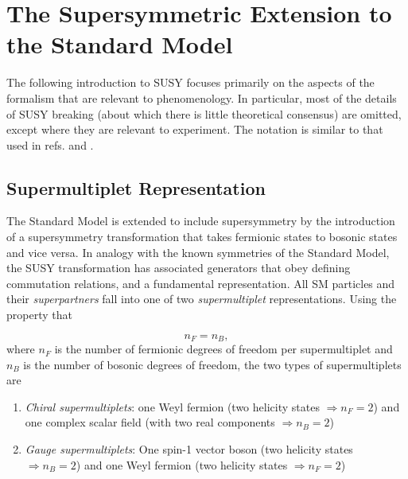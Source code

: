\documentclass[dissertation.tex]{subfiles}
\begin{document}
\chapter{The Supersymmetric Extension to the Standard Model}
\label{chap:The Supersymmetric Extension to the Standard Model}

The following introduction to SUSY focuses primarily on the aspects of the formalism that are relevant to phenomenology.  In particular, most of the details of SUSY breaking (about which there is little theoretical consensus) are omitted, except where they are relevant to experiment.  The notation is similar to that used in refs. \cite{SUSY_primer} and \cite{Aitchison}.

\section{Supermultiplet Representation}
\label{sec:Supermultiplet Representation}

The Standard Model is extended to include supersymmetry by the introduction of a supersymmetry transformation that takes fermionic states to bosonic states and vice versa.  In analogy with the known symmetries of the Standard Model, the SUSY transformation has associated generators that obey defining commutation relations, and a fundamental representation.  All SM particles and their \textit{superpartners} fall into one of two \textit{supermultiplet} representations.  Using the property that

\begin{equation}
n_{F} = n_{B},
\end{equation}
%
where $n_{F}$ is the number of fermionic degrees of freedom per supermultiplet and $n_{B}$ is the number of bosonic degrees of freedom, the two types of supermultiplets are

\begin{enumerate}
  \item \textit{Chiral supermultiplets}: one Weyl fermion (two helicity states $\Rightarrow n_{F} = 2$) and one complex scalar field (with two real components $\Rightarrow n_{B} = 2$)
  \item \textit{Gauge supermultiplets}: One spin-1 vector boson (two helicity states $\Rightarrow n_{B} = 2$) and one Weyl fermion (two helicity states $\Rightarrow n_{F} = 2$)
\end{enumerate}
\end{document}

